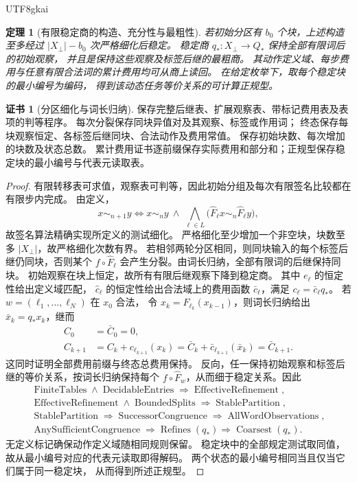 \documentclass[12pt,a4paper,openany,notitlepage]{report}
\theoremstyle{plain}
\newtheorem{theorem}{定理}[chapter]
\theoremstyle{definition}
\newtheorem*{certificate}{证书}
\theoremstyle{remark}
\begin{document}
\begin{CJK*}{UTF8}{gkai}
\begin{theorem}[有限稳定商的构造、充分性与最粗性]
\label{hgov:thm:saturation}
若初始分区有 $b_0$ 个块，上述构造至多经过 $|X_\bot|-b_0$ 次严格细化后稳定。
稳定商 $q_*:X_\bot\to Q_*$ 保持全部有限词后的初始观察，
并且是保持这些观察及标签后继的最粗商。
其动作定义域、每步费用与任意有限合法词的累计费用均可从商上读回。
在给定枚举下，取每个稳定块的最小编号为编码，
得到该动态任务等价关系的可计算正规型。
\end{theorem}
\begin{certificate}[分区细化与词长归纳]
保存完整后继表、扩展观察表、带标记费用表及表项的判等程序。
每次分裂保存同块异值对及其观察、标签或作用词；
终态保存每块观察恒定、各标签后继同块、合法动作及费用常值。
保存初始块数、每次增加的块数及状态总数。
累计费用证书逐前缀保存实际费用和部分和；正规型保存稳定块的最小编号与代表元读取表。
\end{certificate}
\begin{proof}
有限转移表可求值，观察表可判等，因此初始分组及每次有限签名比较都在有限步内完成。
由定义，
\[
 x\sim_{n+1}y
 \Longleftrightarrow
 x\sim_ny\ \land\
 \bigwedge_{\ell\in L}
 \bigl(\widehat F_\ell x\sim_n\widehat F_\ell y\bigr),
\]
故签名算法精确实现所定义的测试细化。
严格细化至少增加一个非空块，块数至多 $|X_\bot|$，故严格细化次数有界。
若相邻两轮分区相同，则同块输入的每个标签后继仍同块，否则某个
$f\circ\widehat F_\ell$ 会产生分裂。由词长归纳，全部有限词的后继保持同块。
初始观察在块上恒定，故所有有限后继观察下降到稳定商。
其中 $e_\ell$ 的恒定性给出定义域匹配，
$\widehat c_\ell$ 的恒定性给出合法域上的费用函数
$\bar c_\ell$，满足 $c_\ell=\bar c_\ell q_*$。
若 $w=(\ell_1,\ldots,\ell_N)$ 在 $x_0$ 合法，
令 $x_k=F_{\ell_k}(x_{k-1})$，则词长归纳给出
$\bar x_k=q_*x_k$，继而
\[
 \begin{aligned}
 C_0&=\bar C_0=0,\\
 C_{k+1}
 &=C_k+c_{\ell_{k+1}}(x_k)
 =\bar C_k+\bar c_{\ell_{k+1}}(\bar x_k)
 =\bar C_{k+1}.
 \end{aligned}
\]
这同时证明全部费用前缀与终态总费用保持。
反向，任一保持初始观察和标签后继的等价关系，按词长归纳保持每个
$f\circ\widehat F_w$，从而细于稳定关系。因此
\[
\begin{gathered}
\operatorname{FiniteTables}\land\operatorname{DecidableEntries}
\Rightarrow\operatorname{EffectiveRefinement},\\
\operatorname{EffectiveRefinement}\land\operatorname{BoundedSplits}
\Rightarrow\operatorname{StablePartition},\\
\operatorname{StablePartition}\Rightarrow\operatorname{SuccessorCongruence}
\Rightarrow\operatorname{AllWordObservations},\\
\operatorname{AnySufficientCongruence}
\Rightarrow\operatorname{Refines}(q_*)
\Rightarrow\operatorname{Coarsest}(q_*).
\end{gathered}
\]
无定义标记确保动作定义域随相同规则保留。
稳定块中的全部规定测试取同值，故从最小编号对应的代表元读取即得解码。
两个状态的最小编号相同当且仅当它们属于同一稳定块，
从而得到所述正规型。
\end{proof}


\end{CJK*}
\end{document}
